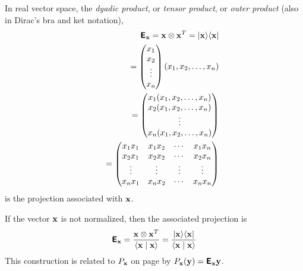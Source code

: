 In real vector space, the {\em dyadic product}, or {\em tensor product}, or {\em outer product}
(also in Dirac's bra and ket notation),
\begin{equation}
\begin{split}
\textsf{\textbf{E}}_{\bf x} = {\bf x} \otimes {\bf x}^T = \vert{\bf x}\rangle \langle {\bf x}\vert
\\
\qquad
=
\begin{pmatrix}
x_1\\
x_2\\
\vdots \\
x_n
\end{pmatrix}
(x_1,x_2,\ldots ,x_n)\\
\qquad
=
\begin{pmatrix}
x_1(x_1,x_2,\ldots ,x_n)\\
x_2(x_1,x_2,\ldots ,x_n)\\
\vdots  \\
x_n(x_1,x_2,\ldots ,x_n)
\end{pmatrix}
\\
\qquad
=
\begin{pmatrix}
x_1x_1&x_1x_2& \cdots&x_1x_n\\
x_2x_1&x_2x_2& \cdots&x_2x_n\\
\vdots & \vdots & \vdots &\vdots \\
x_nx_1&x_nx_2& \cdots&x_nx_n
\end{pmatrix}
\end{split}
\end{equation}
is the projection
associated with ${\bf x}$.

If the vector ${\bf x}$ is not normalized,
then the associated projection is
\begin{equation}
\textsf{\textbf{E}}_{\bf x} = \frac{{\bf x} \otimes {\bf x}^T}{\langle {\bf x}\mid {\bf x}\rangle}
= \frac{\vert{\bf x}\rangle \langle {\bf x}\vert}{\langle {\bf x}\mid {\bf x}\rangle}
\end{equation}
This construction is related to
$P_{\bf x}$ on page \pageref{2011-m-gsp}
by $P_{\bf x}({\bf y})=\textsf{\textbf{E}}_{\bf x}{\bf y}$.

